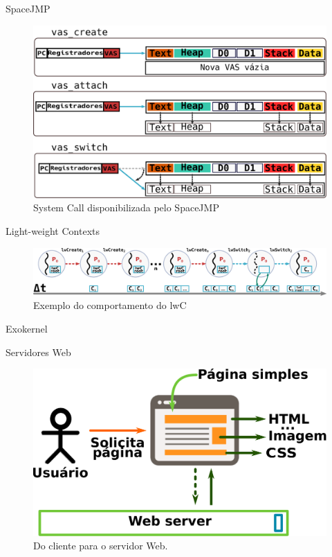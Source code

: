 \documentclass[xcolor={usenames,svgnames,dvipsnames},brazil,english,12pt,aspectratio=149]{beamer}
\begin{document}
\begin{frame}{SpaceJMP}
	\begin{figure}[!h]
		\centering
		\includegraphics[width=.7\textwidth]{mvas_example} 
		\caption{System Call disponibilizada pelo SpaceJMP}
		\label{fig:mvas_example}
	\end{figure}
\end{frame}

\begin{frame}{Light-weight Contexts}
	\begin{figure}[!h]
		\centering
		\includegraphics[width=\textwidth]{lwC} 
		\caption{Exemplo do comportamento do lwC}
		\label{fig:lwc} 
	\end{figure}
\end{frame}

\begin{frame}{Exokernel}
\end{frame}

\begin{frame}{Servidores Web}
	\begin{figure}[!h]
		\centering
		\includegraphics[width=.50\textwidth]{request_a_page}
		\caption{Do cliente para o servidor Web.}
		\label{fig:client_to_web_server}
	\end{figure}
\end{frame}
\end{document}
